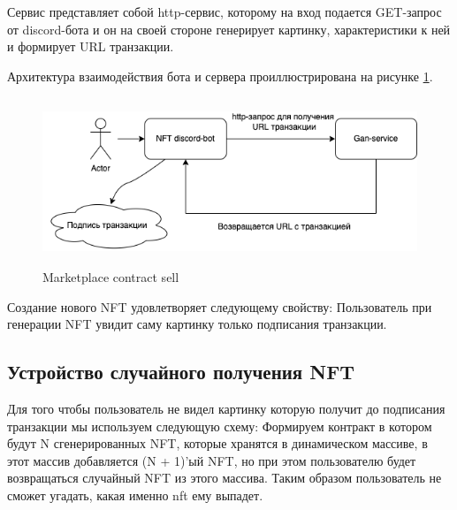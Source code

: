 	Сервис представляет собой http-сервис, которому на вход подается GET-запрос от discord-бота и он на своей стороне генерирует картинку, характеристики к ней и формирует URL транзакции.

	Архитектура взаимодействия бота и сервера проиллюстрирована на рисунке {\color{blue} \ref{fig.ganservice}}.
	\begin{figure}
		\centering
		\includegraphics[height=50mm]{fig/gan-service.png}
		\caption{Marketplace contract sell}
		\label{fig.ganservice}
	\end{figure}


\begin{remark}
	Создание нового NFT удовлетворяет следующему свойству: Пользователь при генерации NFT увидит саму картинку только подписания транзакции.
\end{remark}

\subsection{Устройство случайного получения NFT}
 Для того чтобы пользователь не видел картинку которую получит до подписания транзакции мы используем следующую схему:
  Формируем контракт в котором будут N сгенерированных NFT, которые хранятся в динамическом массиве, в этот массив добавляется (N + 1)'ый NFT, но при этом пользователю будет возвращаться случайный NFT из этого массива.
  Таким образом пользователь не сможет угадать, какая именно nft ему выпадет.
